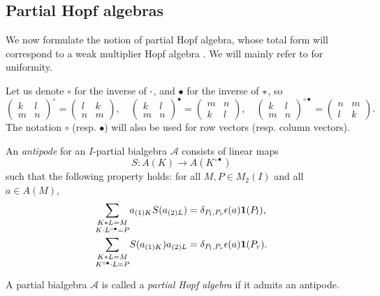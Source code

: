\subsection{Partial Hopf algebras}

We now formulate the notion of partial Hopf algebra, whose total form will correspond to a weak multiplier Hopf algebra \cite{Boh1,VDW2,VDW1}. We will mainly refer to \cite{Boh1} for uniformity.

 Let us denote $\circ$ for the inverse of $\cdot$, and $\bullet$ for the inverse of $*$, so \[\begin{pmatrix} k & l \\ m & n \end{pmatrix}^{\circ} = \begin{pmatrix} l & k \\ n & m \end{pmatrix},\quad \begin{pmatrix} k & l \\ m & n \end{pmatrix}^{\bullet} = \begin{pmatrix} m & n \\ k & l \end{pmatrix},\quad \begin{pmatrix} k & l \\ m & n \end{pmatrix}^{\circ \bullet} = \begin{pmatrix} n & m \\ l & k \end{pmatrix}.\] The notation $\circ$ (resp. $\bullet$) will also be used for row vectors (resp. column vectors).

\begin{Def}\label{DefPartBiAlgAnt} An \emph{antipode} for an
  $I$-partial bialgebra $\mathscr{A}$ consists of linear
maps \[S:A(K)\rightarrow A(K^{\circ\bullet})\]
  such that the following property holds: for all $M,P\in M_2(I)$ and
  all $a\in A(M)$, \begin{align} \label{eq:antipode-pi-l}\underset{K\cdot
      L^{\circ\bullet}=P}{\sum_{K* L = M}} a_{(1)K}S(a_{(2)L})&=
    \delta_{P_l,P_r}\epsilon(a)\mathbf{1}(P_l),
    \\ \label{eq:antipode-pi-r}
    \underset{K^{\circ\bullet}\cdot L=P}{\sum_{K* L = M}}
    S(a_{(1)K})a_{(2)L}&=
    \delta_{P_l,P_r}\epsilon(a)\mathbf{1}(P_r).\end{align}

A partial bialgebra $\mathscr{A}$ is called a \emph{partial Hopf algebra} if it admits an antipode.
\end{Def} 

